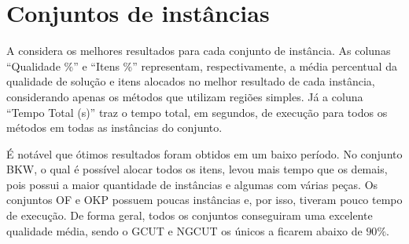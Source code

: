 \section{Conjuntos de instâncias}\label{sec:conjuntos-de-instancias}

A  considera os melhores resultados para cada conjunto de instância.
As colunas “Qualidade \%” e “Itens \%” representam, respectivamente, a média percentual da qualidade
de solução e itens alocados no melhor resultado de cada instância, considerando apenas os
métodos que utilizam regiões simples.
Já a coluna “Tempo Total (s)” traz o tempo total, em segundos, de execução para todos os métodos
em todas as instâncias do conjunto.



É notável que ótimos resultados foram obtidos em um baixo período.
No conjunto BKW, o qual é possível alocar todos os itens, levou mais tempo que os demais, pois
possui a maior quantidade de instâncias e algumas com várias peças.
Os conjuntos OF e OKP possuem poucas instâncias e, por isso, tiveram pouco tempo de execução.
De forma geral, todos os conjuntos conseguiram uma excelente qualidade média, sendo o GCUT e NGCUT
os únicos a ficarem abaixo de $90\%$.
